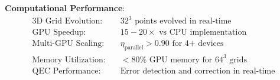 \documentclass[11pt]{article}
\begin{document}
\textbf{Computational Performance}:
\begin{align}
\text{3D Grid Evolution:} &\quad 32^3 \text{ points evolved in real-time} \\
\text{GPU Speedup:} &\quad 15-20× \text{ vs CPU implementation} \\
\text{Multi-GPU Scaling:} &\quad \eta_{\text{parallel}} > 0.90 \text{ for 4+ devices} \\
\text{Memory Utilization:} &\quad <80\% \text{ GPU memory for } 64^3 \text{ grids} \\
\text{QEC Performance:} &\quad \text{Error detection and correction in real-time}
\end{align}
\end{document}
